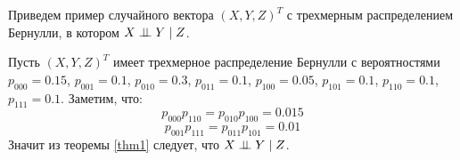 Приведем пример случайного вектора $(X,Y,Z)^T$ с трехмерным распределением Бернулли, в котором $X \perp\!\!\!\perp Y \mid Z$.
\begin{example}
    Пусть $(X,Y,Z)^T$ имеет трехмерное распределение Бернулли с вероятностями
    $p_{000}=0.15$, $p_{001}=0.1$, $p_{010}=0.3$, $p_{011}=0.1$, $p_{100}=0.05$, $p_{101}=0.1$,
    $p_{110}=0.1$, $p_{111}=0.1$.
    Заметим, что:
    $$p_{000}p_{110}=p_{010}p_{100}=0.015$$ $$p_{001}p_{111}=p_{011}p_{101}=0.01$$
    Значит из теоремы \ref{thm1} следует, что $X \perp\!\!\!\perp Y \mid Z$.
\end{example}
